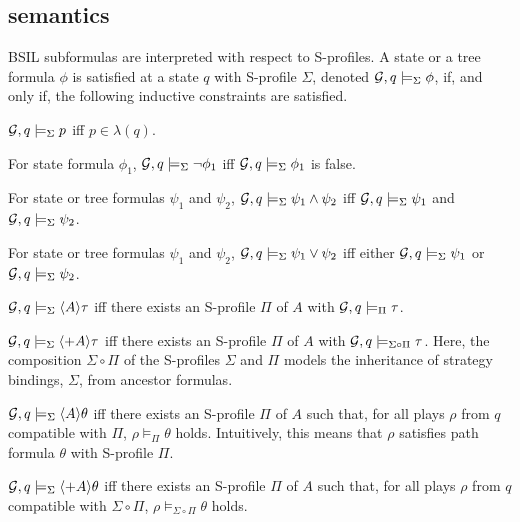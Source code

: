 \subsection{semantics}
BSIL subformulas are interpreted with respect to S-profiles.  
A state or a tree formula $\phi$ is satisfied 
at a state $q$ with S-profile $\Sigma$, denoted ${\cal G},q\models_\Sigma\phi$, if,
and only if, the following inductive constraints are satisfied.
\begin{list1}
\item ${\cal G},q\models_\Sigma p$ iff $p\in \lambda(q)$.
\item For state formula $\phi_1$, 
    ${\cal G},q\models_\Sigma\neg\phi_1$ iff
    ${\cal G},q\models_\Sigma\phi_1$ is false.
\item For state or tree formulas $\psi_1$ and $\psi_2$, 
    ${\cal G},q\models_\Sigma\psi_1\wedge\psi_2$ iff
    ${\cal G},q\models_\Sigma\psi_1$
    and ${\cal G},q\models_\Sigma\psi_2$.
\item For state or tree formulas $\psi_1$ and $\psi_2$, 
    ${\cal G},q\models_\Sigma\psi_1\vee\psi_2$ iff
    either ${\cal G},q\models_\Sigma\psi_1$
    or ${\cal G},q\models_\Sigma\psi_2$.
\item ${\cal G},q\models_\Sigma\langle A\rangle\tau$
    iff there exists an S-profile $\Pi$ of $A$
    with ${\cal G},q\models_{\Pi}\tau$.  
\item ${\cal G},q\models_\Sigma\langle+A\rangle\tau$
    iff there exists an S-profile $\Pi$ of $A$
    with ${\cal G},q\models_{\Sigma\circ\Pi}\tau$.  
    Here, the composition $\Sigma\circ\Pi$ of the S-profiles $\Sigma$ and $\Pi$
    models the inheritance of 
    strategy bindings, $\Sigma$, from ancestor formulas. 
\item ${\cal G},q\models_\Sigma\langle A\rangle\theta$
    iff there exists an S-profile $\Pi$ of $A$ such that,
    for all plays $\rho$ from $q$ compatible with $\Pi$,
    $\rho\models_{\Pi}\theta$ holds.
    Intuitively, this means that $\rho$ satisfies path formula $\theta$ with S-profile $\Pi$.  
\item ${\cal G},q\models_\Sigma\langle + A\rangle\theta$
    iff there exists an S-profile $\Pi$ of $A$ such that, 
    for all plays $\rho$ from $q$ compatible with ${\Sigma\circ\Pi}$,
    $\rho\models_{\Sigma\circ\Pi}\theta$ holds.  
\end{list1} 

